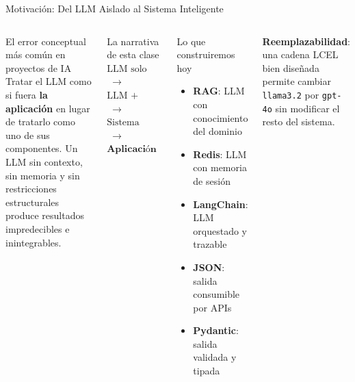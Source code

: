 \documentclass[aspectratio=169]{beamer}
\begin{document}
\begin{frame}{Motivación: Del LLM Aislado al Sistema Inteligente}
  \begin{columns}
    \begin{alertblock}{El error conceptual más común en proyectos de IA}
      Tratar el LLM como si fuera \textbf{la aplicación} en lugar de tratarlo
      como uno de sus componentes. Un LLM sin contexto, sin memoria y sin
      restricciones estructurales produce resultados impredecibles e
      inintegrables.
    \end{alertblock}
    \vspace{0.5em}
    \begin{block}{La narrativa de esta clase}
      \centering
      \large
      $\text{LLM solo}$
      $\;\longrightarrow\;$
      $\text{LLM + RAG}$
      $\;\longrightarrow\;$\\[0.4em]
      $\text{Sistema inteligente}$
      $\;\longrightarrow\;$
      $\textbf{Aplicación empresarial}$
    \end{block}
    \begin{exampleblock}{Lo que construiremos hoy}
      \begin{itemize}
        \item \textbf{RAG}: LLM con conocimiento del dominio
        \item \textbf{Redis}: LLM con memoria de sesión
        \item \textbf{LangChain}: LLM orquestado y trazable
        \item \textbf{JSON}: salida consumible por APIs
        \item \textbf{Pydantic}: salida validada y tipada
      \end{itemize}
    \end{exampleblock}
    \begin{block}{}
      \scriptsize
      \textbf{Reemplazabilidad}: una cadena LCEL bien diseñada
      permite cambiar \texttt{llama3.2} por \texttt{gpt-4o} sin
      modificar el resto del sistema.
    \end{block}
  \end{columns}
\end{frame}
\end{document}
